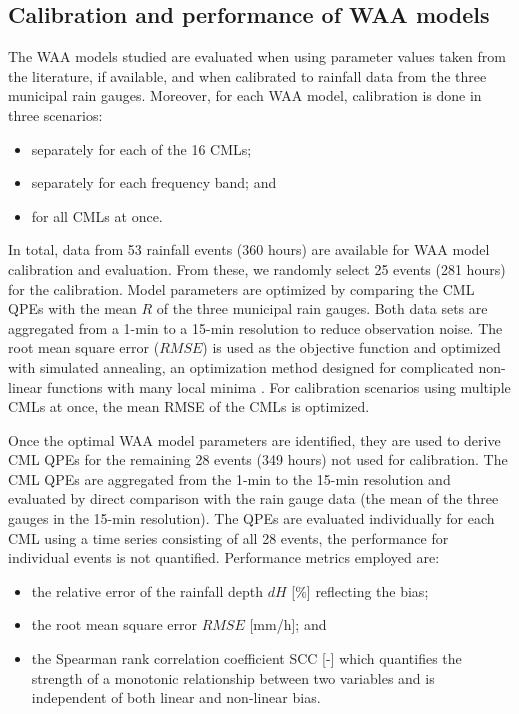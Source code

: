 \documentclass{ctuthesis}\usepackage[]{graphicx}\usepackage[]{color}
\begin{document}
\subsection{Calibration and performance of WAA models} \label{paperIIMethC}

The WAA models studied are evaluated when using parameter values taken from the literature, if available, and when calibrated to rainfall data from the three municipal rain gauges. Moreover, for each WAA model, calibration is done in three scenarios:
        \begin{itemize}
        \itemsep0em 
                \item{separately for each of the 16 CMLs;}
                \item{separately for each frequency band; and}
                \item{for all CMLs at once.}
        \end{itemize}
        

In total, data from 53 rainfall events (360 hours) are available for WAA model  calibration and evaluation. From these, we randomly select 25 events (281 hours) for the calibration. Model parameters are optimized by comparing the CML QPEs with the mean $R$ of the three municipal rain gauges. Both data sets are aggregated from a 1-min to a 15-min resolution to reduce observation noise. The root mean square error ($R\!M\!S\!E$) is used as the objective function and optimized with simulated annealing, an optimization method designed for complicated non-linear functions with many local minima \citep{xiangGeneralizedSimulatedAnnealing2013}. For calibration scenarios using multiple CMLs at once, the mean RMSE of the CMLs is optimized.

Once the optimal WAA model parameters are identified, they are used to derive CML QPEs for the remaining 28 events (349 hours) not used for calibration. The CML QPEs are aggregated from the 1-min to the 15-min resolution and evaluated by direct comparison with the rain gauge data (the mean of the three gauges in the 15-min resolution). The QPEs are evaluated individually for each CML using a time series consisting of all 28 events, the performance for individual events is not quantified. Performance metrics employed are: 
        \begin{samepage}
        \begin{itemize}
        \itemsep0em 
                \item{the relative error of the rainfall depth $d\!H$ [\%] reflecting the bias;}
                \item{the root mean square error $R\!M\!S\!E$ [mm/h]}; and
                \item{the Spearman rank correlation coefficient SCC [-] which quantifies the strength of a monotonic relationship between two variables and is independent of both linear and non-linear bias.}
        \end{itemize}
        \end{samepage}
\end{document}
